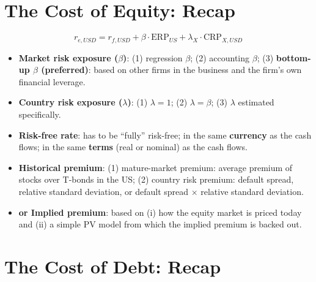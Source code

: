 \section{The Cost of Equity: Recap}

\begin{keybox}
\[
r_{e,USD}=r_{f,USD}+\beta\cdot\text{ERP}_{US}+\lambda_X\cdot\text{CRP}_{X,USD}
\]
\begin{itemize}[leftmargin=*]
  \item \textbf{Market risk exposure ($\beta$)}: (1) regression $\beta$; (2) accounting $\beta$; (3) \textbf{bottom-up $\beta$ (preferred)}: based on other firms in the business and the firm's own financial leverage.
  \item \textbf{Country risk exposure ($\lambda$)}: (1) $\lambda=1$; (2) $\lambda=\beta$; (3) $\lambda$ estimated specifically.
  \item \textbf{Risk-free rate}: has to be ``fully'' risk-free; in the same \textbf{currency} as the cash flows; in the same \textbf{terms} (real or nominal) as the cash flows.
  \item \textbf{Historical premium}: (1) mature-market premium: average premium of stocks over T-bonds in the US; (2) country risk premium: default spread, relative standard deviation, or default spread $\times$ relative standard deviation.
  \item \textbf{or Implied premium}: based on (i) how the equity market is priced today and (ii) a simple PV model from which the implied premium is backed out.
\end{itemize}
\end{keybox}

\section{The Cost of Debt: Recap}

